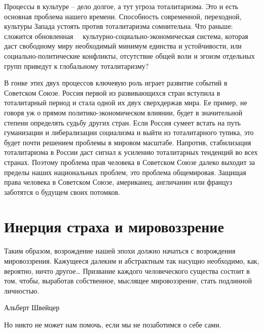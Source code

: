 \documentclass{book}
\begin{document}
Процессы в культуре -- дело долгое, а тут угроза тоталита­ризма. Это и есть основная проблема нашего времени. Способ­ность современной, переходной, культуры Запада устоять против тоталитаризма сомнительна. Что раньше: сложится обновлен­ная   культурно-социально-экономическая система, которая даст свободному миру необходимый минимум единства и ус­тойчивости, или социально-политические конфликты, отсутст­вие общей воли и эгоизм отдельных групп приведут к глобаль­ному тоталитаризму?

В гонке этих двух процессов ключевую роль играет разви­тие событий в Советском Союзе. Россия первой из развивающих­ся стран вступила в тоталитарный период и стала одной их двух сверхдержав мира. Ее пример, не говоря уж о прямом полити­ко-экономическом влиянии, будет в значительной степени определять судьбу других стран. Если Россия сумеет встать на путь гуманизации и либерализации социализма и выйти из тоталитарного тупика, это будет почти решением проблемы в мировом масштабе. Напротив, стабилизация тоталитаризма в России даст сигнал к усилению тоталитарных тенденций во всех странах. Поэтому проблема прав человека в Советском Союзе далеко выходит за пределы наших национальных проблем, это проблема общемировая. Защищая права человека в Советском Союзе, американец, англичанин или француз заботятся о будущем своих потомков.



\section{Инерция страха и мировоззрение}

\epigraph{Таким образом, возрождение нашей эпохи должно начаться с возрождения мировоззрения. Кажущееся далеким и абстрактным так насущно необходимо, как, вероятно, ничто другое\ldots
Призвание каждого человеческого существа состоит в том, чтобы, выработав собственное, мыслящее мировоззрение, стать подлинной личностью.}{Альберт Швейцер%
}

Но никто не может нам помочь, если мы не позаботимся о себе сами.
\end{document}
